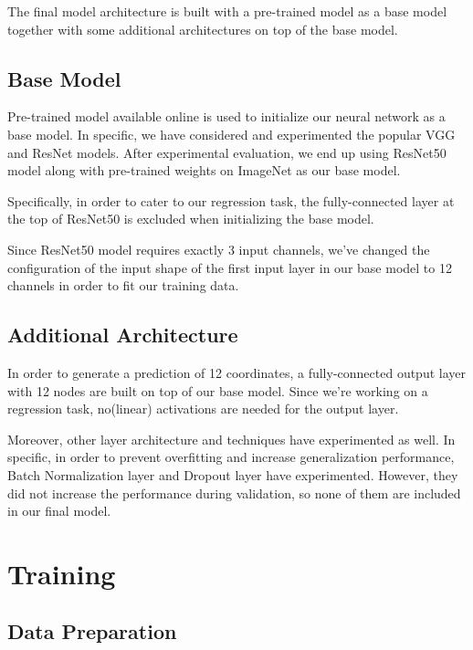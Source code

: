\documentclass[11pt]{article}
\begin{document}
The final model architecture is built with a pre-trained model as a base
model together with some additional architectures on top of the base
model.

    \hypertarget{base-model}{%
\subsection{Base Model}\label{base-model}}

Pre-trained model available online is used to initialize our neural
network as a base model. In specific, we have considered and
experimented the popular VGG and ResNet models. After experimental
evaluation, we end up using ResNet50 model along with pre-trained
weights on ImageNet as our base model.

Specifically, in order to cater to our regression task, the
fully-connected layer at the top of ResNet50 is excluded when
initializing the base model.

Since ResNet50 model requires exactly 3 input channels, we've changed
the configuration of the input shape of the first input layer in our
base model to 12 channels in order to fit our training data.

    \hypertarget{additional-architecture}{%
\subsection{Additional Architecture}\label{additional-architecture}}

In order to generate a prediction of 12 coordinates, a fully-connected
output layer with 12 nodes are built on top of our base model. Since
we're working on a regression task, no(linear) activations are needed
for the output layer.

Moreover, other layer architecture and techniques have experimented as
well. In specific, in order to prevent overfitting and increase
generalization performance, Batch Normalization layer and Dropout layer
have experimented. However, they did not increase the performance during
validation, so none of them are included in our final model.

    \hypertarget{training}{%
\section{Training}\label{training}}

    \hypertarget{data-preparation}{%
\subsection{Data Preparation}\label{data-preparation}}
\end{document}
